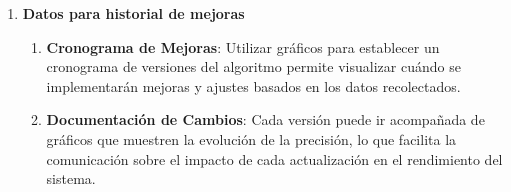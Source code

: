 \begin{enumerate}
    \item \textbf{Datos para historial de mejoras}
    \begin{enumerate}
        \item \textbf{Cronograma de Mejoras}: Utilizar gráficos para establecer un cronograma de versiones del algoritmo permite visualizar cuándo se implementarán mejoras y ajustes basados en los datos recolectados.
        \item \textbf{Documentación de Cambios}: Cada versión puede ir acompañada de gráficos que muestren la evolución de la precisión, lo que facilita la comunicación sobre el impacto de cada actualización en el rendimiento del sistema.
    \end{enumerate}

\end{enumerate}
